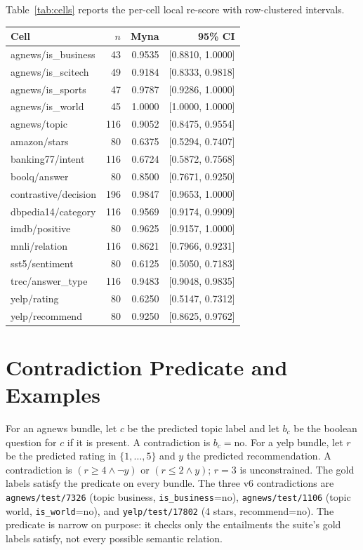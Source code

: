 Table~\ref{tab:cells} reports the per-cell local re-score with row-clustered intervals.

\begin{widetable}
\centering
\footnotesize
\caption{Per-cell local re-score with row-clustered 95\% intervals (20{,}000 replicates, seed 20261031). The interval is on the cell accuracy; the unit resampled is the row, not the question.}
\label{tab:cells}
\begin{tabular}{lrrr}
\toprule
Cell & $n$ & Myna & 95\% CI \\
\midrule
agnews/is\_business & 43 & 0.9535 & [0.8810, 1.0000] \\
agnews/is\_scitech & 49 & 0.9184 & [0.8333, 0.9818] \\
agnews/is\_sports & 47 & 0.9787 & [0.9286, 1.0000] \\
agnews/is\_world & 45 & 1.0000 & [1.0000, 1.0000] \\
agnews/topic & 116 & 0.9052 & [0.8475, 0.9554] \\
amazon/stars & 80 & 0.6375 & [0.5294, 0.7407] \\
banking77/intent & 116 & 0.6724 & [0.5872, 0.7568] \\
boolq/answer & 80 & 0.8500 & [0.7671, 0.9250] \\
contrastive/decision & 196 & 0.9847 & [0.9653, 1.0000] \\
dbpedia14/category & 116 & 0.9569 & [0.9174, 0.9909] \\
imdb/positive & 80 & 0.9625 & [0.9157, 1.0000] \\
mnli/relation & 116 & 0.8621 & [0.7966, 0.9231] \\
sst5/sentiment & 80 & 0.6125 & [0.5050, 0.7183] \\
trec/answer\_type & 116 & 0.9483 & [0.9048, 0.9835] \\
yelp/rating & 80 & 0.6250 & [0.5147, 0.7312] \\
yelp/recommend & 80 & 0.9250 & [0.8625, 0.9762] \\
\bottomrule
\end{tabular}
\end{widetable}

\section{Contradiction Predicate and Examples}
\label{app:predicate}

For an agnews bundle, let $c$ be the predicted topic label and let $b_c$ be the boolean question for $c$ if it is present. A contradiction is $b_c=\text{no}$. For a yelp bundle, let $r$ be the predicted rating in $\{1,\dots,5\}$ and $y$ the predicted recommendation. A contradiction is $(r\ge4 \land \neg y)$ or $(r\le2 \land y)$; $r=3$ is unconstrained. The gold labels satisfy the predicate on every bundle. The three v6 contradictions are \texttt{agnews/test/7326} (topic business, \texttt{is\_business}=no), \texttt{agnews/test/1106} (topic world, \texttt{is\_world}=no), and \texttt{yelp/test/17802} (4 stars, recommend=no). The predicate is narrow on purpose: it checks only the entailments the suite's gold labels satisfy, not every possible semantic relation.

